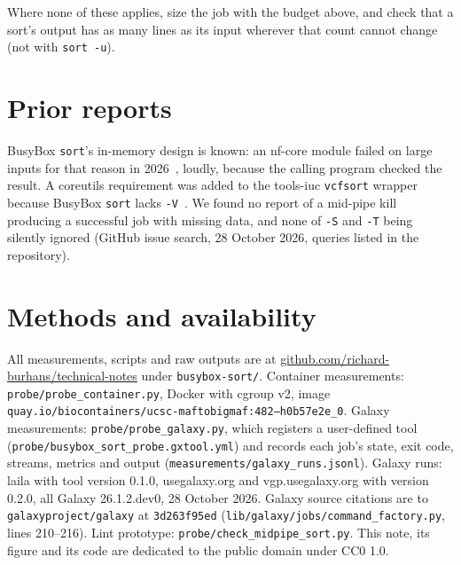 \documentclass[11pt,letterpaper]{article}
\newcommand{\code}[1]{\texttt{#1}}
\begin{document}
\noindent Where none of these applies, size the job with the budget above, and check that a sort's output has as
many lines as its input wherever that count cannot change (not with \code{sort -u}).

\section{Prior reports}

BusyBox \code{sort}'s in-memory design is known: an nf-core module failed on large inputs for that reason in
2026~\cite{nfcore13033}, loudly, because the calling program checked the result. A coreutils requirement was added
to the tools-iuc \code{vcfsort} wrapper because BusyBox \code{sort} lacks \code{-V}~\cite{iuc3920}. We found no
report of a mid-pipe kill producing a successful job with missing data, and none of \code{-S} and \code{-T} being
silently ignored (GitHub issue search, 28 October 2026, queries listed in the repository).

\section*{Methods and availability}

All measurements, scripts and raw outputs are at
\href{https://github.com/richard-burhans/technical-notes}{github.com/richard-burhans/technical-notes} under
\code{busybox-sort/}. Container measurements: \code{probe/probe\_container.py}, Docker with cgroup v2, image
\code{quay.io/biocontainers/ucsc-maftobigmaf:482--h0b57e2e\_0}. Galaxy measurements: \code{probe/probe\_galaxy.py},
which registers a user-defined tool (\code{probe/busybox\_sort\_probe.gxtool.yml}) and records each job's state,
exit code, streams, metrics and output (\code{measurements/galaxy\_runs.jsonl}). Galaxy runs: laila with tool
version 0.1.0, usegalaxy.org and vgp.usegalaxy.org with version 0.2.0, all Galaxy 26.1.2.dev0, 28 October 2026. Galaxy
source citations are to \code{galaxyproject/galaxy} at \code{3d263f95ed} (\code{lib/galaxy/jobs/command\_factory.py},
lines 210--216). Lint prototype: \code{probe/check\_midpipe\_sort.py}. This note, its figure and its code are
dedicated to the public domain under CC0 1.0.
\end{document}
